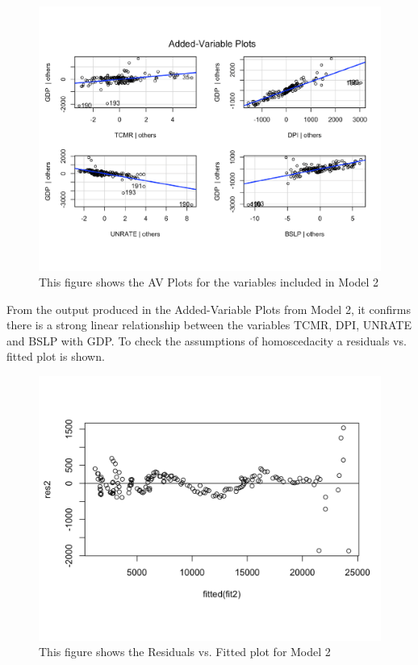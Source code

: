 \documentclass[12pt]{article}
\begin{document}
\begin{figure}[H]
  \centering
  \includegraphics[scale = .35]{AVP2}
  \caption{This figure shows the AV Plots for the variables included in Model 2}
\end{figure}
From the output produced in the Added-Variable Plots from Model 2, it confirms there is a strong linear relationship between the variables TCMR, DPI, UNRATE and BSLP with GDP. 
To check the assumptions of homoscedacity a residuals vs. fitted plot is shown.
\begin{figure}[H]
  \centering
  \includegraphics[scale = .35]{res2}
  \caption{This figure shows the Residuals vs. Fitted plot for Model 2}
\end{figure}
\end{document}
